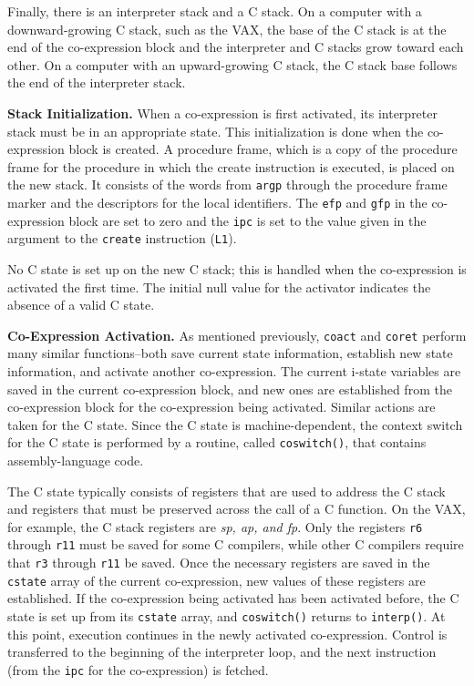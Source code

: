 Finally, there is an interpreter stack and a C stack. On a computer
with a downward-growing C stack, such as the VAX, the base of the C
stack is at the end of the co-expression block and the interpreter and
C stacks grow toward each other. On a computer with an upward-growing
C stack, the C stack base follows the end of the interpreter stack.

\textbf{Stack Initialization.} When a co-expression is first
activated, its interpreter stack must be in an appropriate state. This
initialization is done when the co-expression block is created. A
procedure frame, which is a copy of the procedure frame for the
procedure in which the create instruction is executed, is placed on
the new stack. It consists of the words from \texttt{argp} through the
procedure frame marker and the descriptors for the local
identifiers. The \texttt{efp} and \texttt{gfp} in the co-expression
block are set to zero and the \texttt{ipc} is set to the value given
in the argument to the \texttt{create} instruction (\texttt{L1}).

No C state is set up on the new C stack; this is handled when the co-expression is activated the first time. The initial
null value for the activator indicates the absence of a valid C state.


\textbf{Co-Expression Activation.} As mentioned previously,
\texttt{coact} and \texttt{coret} perform many similar functions--both
save current state information, establish new state information, and
activate another co-expression.  The current i-state variables are
saved in the current co-expression block, and new ones are established
from the co-expression block for the co-expression being
activated. Similar actions are taken for the C state. Since the C
state is machine-dependent, the {\textquotedbl}context
switch{\textquotedbl} for the C state is performed by a routine,
called \texttt{coswitch()}, that contains assembly-language code.

The C state typically consists of registers that are used to address
the C stack and registers that must be preserved across the call of a
C function. On the VAX, for example, the C stack registers are
\textit{sp, ap, and fp}. Only the registers \texttt{r6} through
\texttt{r11} must be saved for some C compilers, while other C
compilers require that \texttt{r3} through \texttt{r11} be saved. Once
the necessary registers are saved in the \texttt{cstate} array of the
current co-expression, new values of these registers are
established. If the co-expression being activated has been activated
before, the C state is set up from its \texttt{cstate} array, and
\texttt{coswitch()} returns to \texttt{interp()}. At this point,
execution continues in the newly activated co-expression. Control is
transferred to the beginning of the interpreter loop, and the next
instruction (from the \texttt{ipc} for the co-expression) is fetched.

